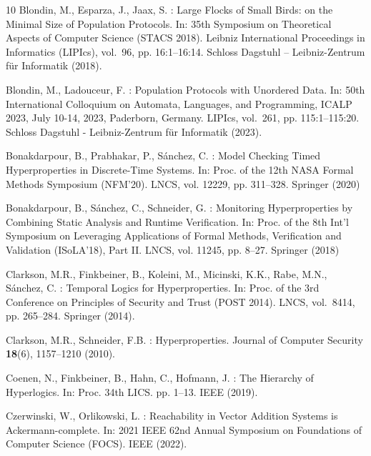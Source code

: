 \documentclass[10pt,a4paper]{article}
\begin{document}
\begin{thebibliography}{10}
	Blondin, M., Esparza, J., Jaax, S.
	: {Large Flocks of Small Birds: on the Minimal Size of Population Protocols}.
	In: 35th Symposium on Theoretical Aspects of Computer Science (STACS 2018).
	Leibniz International Proceedings in Informatics (LIPIcs), vol.~96, pp.
	16:1--16:14.
	Schloss Dagstuhl -- Leibniz-Zentrum f{\"u}r Informatik (2018).

	 Blondin, M., Ladouceur, F.
	: {Population Protocols with Unordered Data}.
	In: 50th International Colloquium on Automata, Languages, and Programming, {ICALP} 2023, July 10-14, 2023, Paderborn, Germany.
	LIPIcs, vol.~261, pp.
	115:1--115:20.
	Schloss Dagstuhl - Leibniz-Zentrum f{\"{u}}r Informatik (2023).

	 Bonakdarpour, B., Prabhakar, P., S\'anchez, C.
	: {Model Checking Timed Hyperproperties in Discrete-Time Systems}.
	In: Proc.
	of the 12th NASA Formal Methods Symposium (NFM'20).
	LNCS, vol.
	12229, pp. 311--328.
	Springer (2020)

	 Bonakdarpour, B., S{\'{a}}nchez, C., Schneider, G.
	: {Monitoring Hyperproperties by Combining Static Analysis and Runtime Verification}.
	In: Proc.
	of the 8th Int'l Symposium on Leveraging Applications of Formal Methods, Verification and Validation (ISoLA'18), Part II.
	LNCS, vol.
	11245, pp. 8--27.
	Springer (2018)

	 Clarkson, M.R., Finkbeiner, B., Koleini, M., Micinski, K.K., Rabe, M.N., S\'{a}nchez, C.
	: {Temporal Logics for Hyperproperties}.
	In: Proc.
	of the 3rd Conference on Principles of Security and Trust (POST 2014).
	LNCS, vol.~8414, pp.
	265--284.
	Springer (2014).

	Clarkson, M.R., Schneider, F.B.
	: {Hyperproperties}.
	Journal of Computer Security \textbf{18}(6), 1157--1210 (2010).

	Coenen, N., Finkbeiner, B., Hahn, C., Hofmann, J.
	: {The Hierarchy of Hyperlogics}.
	In: Proc.
	34th {LICS}. pp. 1--13.
	IEEE (2019).

	Czerwinski, W., Orlikowski, L.
	: {Reachability in Vector Addition Systems is Ackermann-complete}.
	In: 2021 IEEE 62nd Annual Symposium on Foundations of Computer Science (FOCS).
	IEEE (2022).


\end{thebibliography}
\end{document}
